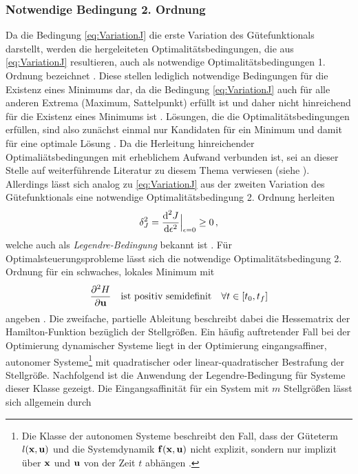 \subsubsection{Notwendige Bedingung 2. Ordnung}\label{subsubsec:Legendre_Bedingung}
Da die Bedingung \eqref{eq:VariationJ} die erste Variation des Gütefunktionals darstellt, werden die hergeleiteten Optimalitätsbedingungen, die aus \eqref{eq:VariationJ} resultieren, auch als notwendige Optimalitätsbedingungen 1. Ordnung bezeichnet \cite{Papageorgiou.2012}. Diese stellen lediglich notwendige Bedingungen für die Existenz eines Minimums dar, da die Bedingung \eqref{eq:VariationJ} auch für alle anderen Extrema (Maximum, Sattelpunkt) erfüllt ist und daher nicht hinreichend für die Existenz eines Minimums ist \cite{Papageorgiou.2012}. Lösungen, die die Optimalitätsbedingungen erfüllen, sind also zunächst einmal nur Kandidaten für ein Minimum und damit für eine optimale Lösung \cite{Gerdts.2010}. Da die Herleitung hinreichender Optimaliätsbedingungen mit erheblichem Aufwand verbunden ist, sei an dieser Stelle auf weiterführende Literatur zu diesem Thema verwiesen (siehe \cite{Gerdts.2010,Maurer}). Allerdings lässt sich analog zu \eqref{eq:VariationJ} aus der zweiten Variation des Gütefunktionals eine notwendige Optimalitätsbedingung 2. Ordnung herleiten
\begin{equation}
\delta^2_J = \frac{\textrm{d}^2J}{\textrm{d}{\epsilon^2}}\Big|_{\epsilon=0}\geq 0\,,
\end{equation}
welche auch als \textit{Legendre-Bedingung} bekannt ist \cite{KnutGraichen.2012}. Für Optimalsteuerungsprobleme lässt sich die notwendige Optimalitätsbedingung 2. Ordnung für ein schwaches, lokales Minimum mit 
\begin{equation}
\frac{\partial^2 H}{\partial \boldsymbol{\mathrm{u}}} \quad \textrm{ist positiv semidefinit} \quad \forall t \in[t_0,t_f]
\end{equation}
angeben \cite{KnutGraichen.2012}. Die zweifache, partielle Ableitung beschreibt dabei die Hessematrix der Hamilton-Funktion bezüglich der Stellgrößen. Ein häufig auftretender Fall bei der Optimierung dynamischer Systeme liegt in der Optimierung eingangsaffiner, autonomer Systeme\footnote{Die Klasse der autonomen Systeme beschreibt den Fall, dass der Güteterm $l(\boldsymbol{\mathrm{x}},\boldsymbol{\mathrm{u}})$ und die Systemdynamik $\boldsymbol{\mathrm{f}}(\boldsymbol{\mathrm{x}},\boldsymbol{\mathrm{u}})$ nicht explizit, sondern nur implizit über $\boldsymbol{\mathrm{x}}$ und $\boldsymbol{\mathrm{u}}$ von der Zeit $t$ abhängen \cite{KnutGraichen.2012}.} mit quadratischer oder linear-quadratischer Bestrafung der Stellgröße. Nachfolgend ist die Anwendung der Legendre-Bedingung für Systeme dieser Klasse gezeigt. Die Eingangsaffinität für ein System mit $m$ Stellgrößen lässt sich allgemein durch 
